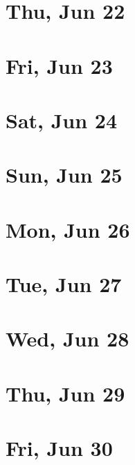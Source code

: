 	\section{Thu, Jun 22}
		
	\section{Fri, Jun 23}
		
	\section{Sat, Jun 24}
		
	\section{Sun, Jun 25}
		
	\section{Mon, Jun 26}
		
	\section{Tue, Jun 27}
		
	\section{Wed, Jun 28}
		
	\section{Thu, Jun 29}
		
	\section{Fri, Jun 30}
		

